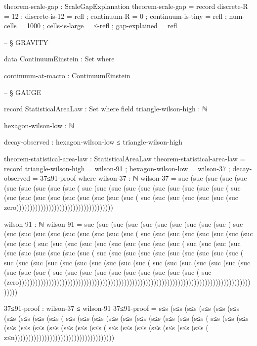 \documentclass[11pt,a4paper]{book}
\begin{document}
\begin{code}
theorem-scale-gap : ScaleGapExplanation
theorem-scale-gap = record
  { discrete-R = 12
  ; discrete-is-12 = refl
  ; continuum-R = 0
  ; continuum-is-tiny = refl
  ; num-cells = 1000
  ; cells-is-large = ≤-refl
  ; gap-explained = refl
  }


-- § GRAVITY

data ContinuumEinstein : Set where

  continuum-at-macro : ContinuumEinstein


-- § GAUGE

record StatisticalAreaLaw : Set where
  field
    triangle-wilson-high : ℕ
    
    hexagon-wilson-low : ℕ
    
    decay-observed : hexagon-wilson-low ≤ triangle-wilson-high

theorem-statistical-area-law : StatisticalAreaLaw
theorem-statistical-area-law = record
  { triangle-wilson-high = wilson-91  
  ; hexagon-wilson-low = wilson-37    
  ; decay-observed = 37≤91-proof
  }
  where
    wilson-37 : ℕ
    wilson-37 = suc (suc (suc (suc (suc (suc (suc (suc (suc (suc (
                suc (suc (suc (suc (suc (suc (suc (suc (suc (suc (
                suc (suc (suc (suc (suc (suc (suc (suc (suc (suc (
                suc (suc (suc (suc (suc (suc (suc 
                zero))))))))))))))))))))))))))))))))))))
    
    wilson-91 : ℕ
    wilson-91 = suc (suc (suc (suc (suc (suc (suc (suc (suc (suc (
                suc (suc (suc (suc (suc (suc (suc (suc (suc (suc (
                suc (suc (suc (suc (suc (suc (suc (suc (suc (suc (
                suc (suc (suc (suc (suc (suc (suc (suc (suc (suc (
                suc (suc (suc (suc (suc (suc (suc (suc (suc (suc (
                suc (suc (suc (suc (suc (suc (suc (suc (suc (suc (
                suc (suc (suc (suc (suc (suc (suc (suc (suc (suc (
                suc (suc (suc (suc (suc (suc (suc (suc (suc (suc (
                suc (suc (suc (suc (suc (suc (suc (suc (suc (suc (
                suc (zero)))))))))))))))))))))))))))))))))))))))))))))))))))))))))))))))))))))))))))))))))))))))))))
    
    37≤91-proof : wilson-37 ≤ wilson-91
    37≤91-proof = s≤s (s≤s (s≤s (s≤s (s≤s (s≤s (s≤s (s≤s (s≤s (s≤s (
                  s≤s (s≤s (s≤s (s≤s (s≤s (s≤s (s≤s (s≤s (s≤s (s≤s (
                  s≤s (s≤s (s≤s (s≤s (s≤s (s≤s (s≤s (s≤s (s≤s (s≤s (
                  s≤s (s≤s (s≤s (s≤s (s≤s (s≤s (s≤s (
                  z≤n)))))))))))))))))))))))))))))))))))))



\end{code}
\end{document}
